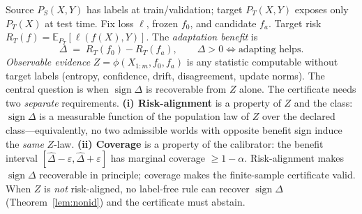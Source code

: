 \documentclass[conference]{IEEEtran}
\theoremstyle{plain}
\theoremstyle{definition}
\theoremstyle{remark}
\newcommand{\E}{\mathbb{E}}
\newcommand{\sign}{\operatorname{sign}}
\begin{document}
Source $P_S(X,Y)$ has labels at train/validation; target $P_T(X,Y)$ exposes only $P_T(X)$
at test time. Fix loss $\ell$, frozen $f_0$, and candidate $f_a$. Target risk
$R_T(f)=\E_{P_T}[\ell(f(X),Y)]$. The \emph{adaptation benefit} is
\begin{equation}
\Delta \;=\; R_T(f_0)-R_T(f_a),\qquad \Delta>0 \iff \text{adapting helps.}
\end{equation}
\emph{Observable evidence} $Z=\phi(X_{1:m},f_0,f_a)$ is any statistic computable without
target labels (entropy, confidence, drift, disagreement, update norms). The central
question is when $\sign\Delta$ is recoverable from $Z$ alone. The certificate needs two \emph{separate}
requirements. \textbf{(i) Risk-alignment} is a property of $Z$ and the class: $\sign\Delta$ is a
measurable function of the population law of $Z$ over the declared class---equivalently, no two
admissible worlds with opposite benefit sign induce the \emph{same} $Z$-law. \textbf{(ii) Coverage}
is a property of the calibrator: the benefit interval
$[\widehat\Delta-\varepsilon,\widehat\Delta+\varepsilon]$ has marginal coverage $\ge1-\alpha$.
Risk-alignment makes $\sign\Delta$ recoverable in principle; coverage makes the finite-sample
certificate valid. When $Z$ is \emph{not} risk-aligned, no label-free rule can recover $\sign\Delta$
(Theorem~\ref{lem:nonid}) and the certificate must abstain.

\begin{center}
\end{center}

\begin{center}
\end{center}
\end{document}
